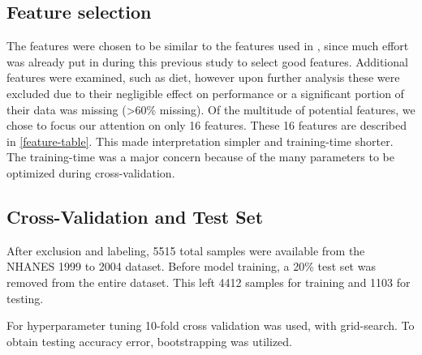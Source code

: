 \documentclass{article} %
\begin{document}
\subsection{Feature selection}
The features were chosen to be similar to the features used in \cite{yu_application_2010}, since much effort was already put in during this previous study to select good features. Additional features were examined, such as diet, however upon further analysis these were excluded due to their negligible effect on performance or a significant portion of their data was missing (>60\% missing). Of the multitude of potential features, we chose to focus our attention on only 16 features. These 16 features are described in \ref{feature-table}. This made interpretation simpler and training-time shorter. The training-time was a major concern because of the many parameters to be optimized during cross-validation.

\subsection{Cross-Validation and Test Set}
After exclusion and labeling, 5515 total samples were available from the NHANES 1999 to 2004 dataset. Before model training, a 20\% test set was removed from the entire dataset. This left 4412 samples for training and 1103 for testing. 

For hyperparameter tuning 10-fold cross validation was used, with grid-search. To obtain testing accuracy error, bootstrapping was utilized. 
\end{document}
